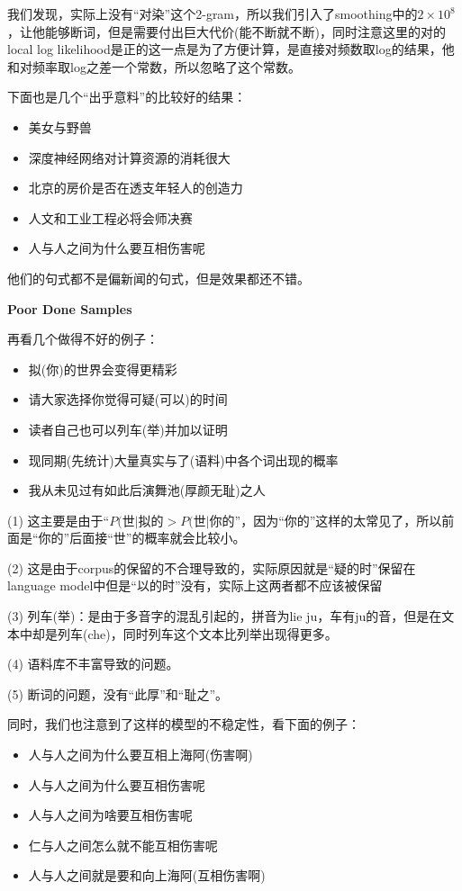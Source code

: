 \documentclass{article}
\begin{document}
我们发现，实际上没有“对染”这个2-gram，所以我们引入了smoothing中的$2\times10^8$，让他能够断词，但是需要付出巨大代价(能不断就不断)，同时注意这里的对的local log likelihood是正的这一点是为了方便计算，是直接对频数取log的结果，他和对频率取log之差一个常数，所以忽略了这个常数。

下面也是几个“出乎意料”的比较好的结果：

\begin{itemize}
	\item 美女与野兽
	\item 深度神经网络对计算资源的消耗很大
	\item 北京的房价是否在透支年轻人的创造力
	\item 人文和工业工程必将会师决赛
	\item 人与人之间为什么要互相伤害呢
\end{itemize}

他们的句式都不是偏新闻的句式，但是效果都还不错。

\noindent \textbf{Poor Done Samples}

再看几个做得不好的例子：

\begin{itemize}
	\item 拟(你)的世界会变得更精彩
	\item 请大家选择你觉得可疑(可以)的时间
	\item 读者自己也可以列车(举)并加以证明
	\item 现同期(先统计)大量真实与了(语料)中各个词出现的概率
	\item 我从未见过有如此后演舞池(厚颜无耻)之人
\end{itemize}

(1) 这主要是由于“$P(\text{世}\lvert\text{拟的}>P(\text{世}\lvert\text{你的}$”，因为“你的”这样的太常见了，所以前面是“你的”后面接“世”的概率就会比较小。

(2) 这是由于corpus的保留的不合理导致的，实际原因就是“疑的时”保留在language model中但是“以的时”没有，实际上这两者都不应该被保留

(3) 列车(举)：是由于多音字的混乱引起的，拼音为lie ju，车有ju的音，但是在文本中却是列车(che)，同时列车这个文本比列举出现得更多。

(4) 语料库不丰富导致的问题。

(5) 断词的问题，没有“此厚”和“耻之”。

同时，我们也注意到了这样的模型的不稳定性，看下面的例子：

\begin{itemize}
\item 人与人之间为什么要互相上海阿(伤害啊)
\item 人与人之间为什么要互相伤害呢
\item 人与人之间为啥要互相伤害呢
\item 仁与人之间怎么就不能互相伤害呢
\item 人与人之间就是要和向上海阿(互相伤害啊)
\end{itemize}
\end{document}
